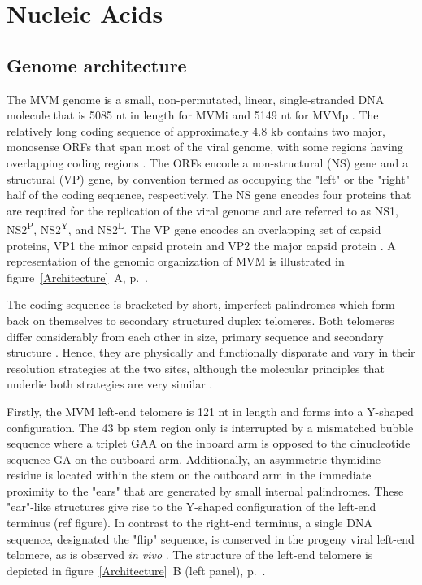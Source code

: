 \section{Nucleic Acids}

\subsection{Genome architecture}
The MVM genome is a small, non-permutated, linear, single-stranded DNA molecule \cite{pmid789912, pmid225040, Genome1, Genome2} that is 5085 nt in length for MVMi \cite{pmid3855242} and 5149 nt for MVMp \cite{pmid6298737}. The relatively long coding sequence of approximately 4.8 kb contains two major, monosense ORFs that span most of the viral genome, with some regions having overlapping coding regions \cite{pmid6298737}. The ORFs encode a non-structural (NS) gene and a structural (VP) gene, by convention termed as occupying the "left" or the "right" half of the coding sequence, respectively. The NS gene encodes four proteins that are required for the replication of the viral genome and are referred to as NS1, NS2\textsuperscript{P}, NS2\textsuperscript{Y}, and NS2\textsuperscript{L}. The VP gene encodes an overlapping set of capsid proteins, VP1 the minor capsid protein and VP2 the major capsid protein \cite{pmid6828378, pmid2939261, pmid2942705}. A representation of the genomic organization of MVM is illustrated in figure~\ref{Architecture}~A, p.~\pageref{Architecture}.           

The coding sequence is bracketed by short, imperfect palindromes which form back on themselves to secondary structured duplex telomeres. Both telomeres differ considerably from each other in size, primary sequence and secondary structure \cite{pmid6298737}. Hence, they are physically and functionally disparate and vary in their resolution strategies at the two sites, although the molecular principles that underlie both strategies are very similar \cite{encapsidation}. 

Firstly, the MVM left-end telomere is 121 nt in length and forms into a Y-shaped configuration. The 43 bp stem region only is interrupted by a mismatched bubble sequence where a triplet GAA on the inboard arm is opposed to the dinucleotide sequence GA on the outboard arm. Additionally, an asymmetric thymidine residue is located within the stem on the outboard arm in the immediate proximity to the "ears" that are generated by small internal palindromes. These "ear"-like structures give rise to the Y-shaped configuration of the left-end terminus \cite{pmid225040, pmid6298737, pmid3973977, replication} (ref figure). In contrast to the right-end terminus, a single DNA sequence, designated the "flip" sequence, is conserved in the progeny viral left-end telomere, as is observed \textit{in vivo} \cite{pmid3973977}. The structure of the left-end telomere is depicted in figure~\ref{Architecture}~B (left panel), p.~\pageref{Architecture}. 

